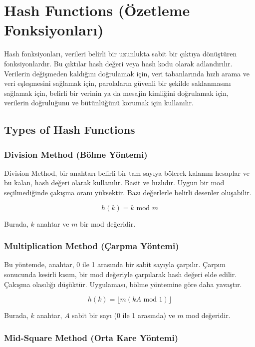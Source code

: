 \section{Hash Functions (Özetleme Fonksiyonları)}

Hash fonksiyonları, verileri belirli bir uzunlukta sabit bir çıktıya dönüştüren fonksiyonlardır. Bu çıktılar hash değeri veya hash kodu olarak adlandırılır. Verilerin değişmeden kaldığını doğrulamak için, veri tabanlarında hızlı arama ve veri eşleşmesini sağlamak için, parolaların güvenli bir şekilde saklanmasını sağlamak için, belirli bir verinin ya da mesajin kimliğini doğrulamak için, verilerin doğruluğunu ve bütünlüğünü korumak için kullanılır.

\subsection{Types of Hash Functions}

\subsubsection{Division Method (Bölme Yöntemi)}

Division Method, bir anahtarı belirli bir tam sayıya bölerek kalanını hesaplar ve bu kalan, hash değeri olarak kullanılır. Basit ve hızlıdır. Uygun bir mod seçilmediğinde çakışma oranı yüksektir. Bazı değerlerle belirli desenler oluşabilir.

\[ h(k) = k \text{ mod } m \]

Burada, $k$ anahtar ve $m$ bir mod değeridir.

\subsubsection{Multiplication Method (Çarpma Yöntemi)}

Bu yöntemde, anahtar, 0 ile 1 arasında bir sabit sayıyla çarpılır. Çarpım sonucunda kesirli kısım, bir mod değeriyle çarpılarak hash değeri elde edilir. Çakışma olasılığı düşüktür. Uygulaması, bölme yöntemine göre daha yavaştır.

\[ h(k) = \lfloor m(kA \text{ mod } 1) \rfloor \]

Burada, $k$ anahtar, $A$ sabit bir sayı (0 ile 1 arasında) ve $m$ mod değeridir.

\subsubsection{Mid-Square Method (Orta Kare Yöntemi)}

